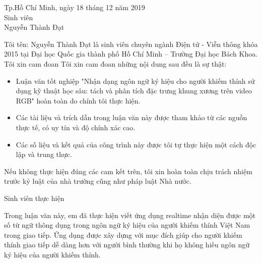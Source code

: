 \begin{center}
\hspace{7cm} Tp.Hồ Chí Minh, ngày 18 tháng 12 năm 2019 \\
\hspace{7cm} Sinh viên \\
\hspace{7cm} Nguyễn Thành Đạt
\end{center}



\newpage
{}
\thispagestyle{loi_cam_doan}
\begin{center}
{}
\end{center}

\noindent Tôi tên: Nguyễn Thành Đạt là sinh viên chuyên ngành Điện tử - Viễn thông khóa 2015 tại Đại học Quốc gia thành phố Hồ Chí Minh – Trường Đại học Bách Khoa. Tôi xin cam đoan Tôi xin cam đoan những nội dung sau đều là sự thật:
\begin{itemize}
\item Luận văn tốt nghiệp "Nhận dạng ngôn ngữ ký hiệu cho người khiếm thính sử dụng kỹ thuật học sâu: tách và phân tích đặc trưng khung xương trên video RGB" hoàn toàn do chính tôi thực hiện.
\item Các tài liệu và trích dẫn trong luận văn này được tham khảo từ các nguồn thực tế, có uy tín và độ chính xác cao.
\item Các số liệu và kết quả của công trình này được tôi tự thực hiện một cách độc lập và trung thực.
\end{itemize}

Nếu không thực hiện đúng các cam kết trên, tôi xin hoàn toàn chịu trách nhiệm trước kỷ luật của nhà trường cũng như pháp luật Nhà nước.
\\
[3cm]
\begin{center}
\hspace{7cm} Sinh viên thực hiện
\end{center}


\newpage
{}
\thispagestyle{tom_tat}
\begin{center}
{}
\end{center}

Trong luận văn này, em đã thực hiện viết ứng dụng realtime nhận diện được một số từ ngữ thông dụng trong ngôn ngữ ký hiệu của người khiếm thính Việt Nam trong giao tiếp. Ứng dụng được xây dựng với mục đích giúp cho người khiếm thính giao tiếp dễ dàng hơn với người bình thường khi họ không hiếu ngôn ngữ ký hiệu của người khiếm thính.

